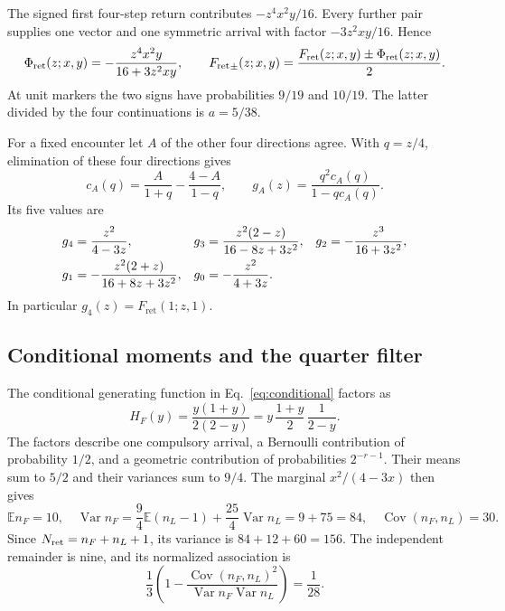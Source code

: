 \documentclass[aps,prx,onecolumn,10pt,notitlepage,nofootinbib,longbibliography]{revtex4-2}
\numberwithin{equation}{section}
\numberwithin{table}{section}
\newcommand{\EE}{\mathbb E}
\newcommand{\Var}{\operatorname{Var}}
\newcommand{\Cov}{\operatorname{Cov}}
\newcommand{\Fret}{F_{\mathrm{ret}}}
\newcommand{\Phis}{\Phi_{\rm ret}}
\begin{document}
The signed first four-step return contributes $-z^4x^2y/16$. Every further
pair supplies one vector and one symmetric arrival with factor
$-3z^2xy/16$. Hence
\begin{equation}
 \Phis(z;x,y)=-\frac{z^4x^2y}{16+3z^2xy},\qquad
 {\Fret}_\pm(z;x,y)=\frac{\Fret(z;x,y)\pm\Phis(z;x,y)}2.
 \label{eq:signedjointreturn}
\end{equation}
At unit markers the two signs have probabilities $9/19$ and $10/19$.
The latter divided by the four continuations is $a=5/38$.

For a fixed encounter let $A$ of the other four directions agree. With
$q=z/4$, elimination of these four directions gives
\begin{equation}
 c_A(q)=\frac{A}{1+q}-\frac{4-A}{1-q},\qquad
 g_A(z)=\frac{q^2c_A(q)}{1-qc_A(q)}.
 \label{eq:retaineddirectionreturn}
\end{equation}
Its five values are
\begin{align}
 g_4&=\frac{z^2}{4-3z},&
 g_3&=\frac{z^2(2-z)}{16-8z+3z^2},&
 g_2&=-\frac{z^3}{16+3z^2},\notag\\
 g_1&=-\frac{z^2(2+z)}{16+8z+3z^2},&
 g_0&=-\frac{z^2}{4+3z}.&&
 \label{eq:fiveclockreturns}
\end{align}
In particular $g_4(z)=\Fret(1;z,1)$.

\subsection{Conditional moments and the quarter filter}

The conditional generating function in Eq.~\eqref{eq:conditional} factors as
\begin{equation}
 H_F(y)=\frac{y(1+y)}{2(2-y)}
     =y\,\frac{1+y}{2}\,\frac1{2-y}.
 \label{eq:conditionalfactor}
\end{equation}
The factors describe one compulsory arrival, a Bernoulli contribution of
probability $1/2$, and a geometric contribution of probabilities $2^{-r-1}$.
Their means sum to $5/2$ and their variances sum to $9/4$. The marginal
$x^2/(4-3x)$ then gives
\begin{equation}
 \EE n_F=10,\quad
 \Var n_F=\frac94\EE(n_L-1)+\frac{25}{4}\Var n_L=9+75=84,
 \quad\Cov(n_F,n_L)=30.
 \label{eq:totalvisitvariance}
\end{equation}
Since $N_{\rm ret}=n_F+n_L+1$, its variance is $84+12+60=156$. The independent
remainder is nine, and its normalized association is
\begin{equation}
 \frac13\left(1-\frac{\Cov(n_F,n_L)^2}{\Var n_F\Var n_L}\right)=\frac1{28}.
 \label{eq:associationfrommoments}
\end{equation}
\end{document}
